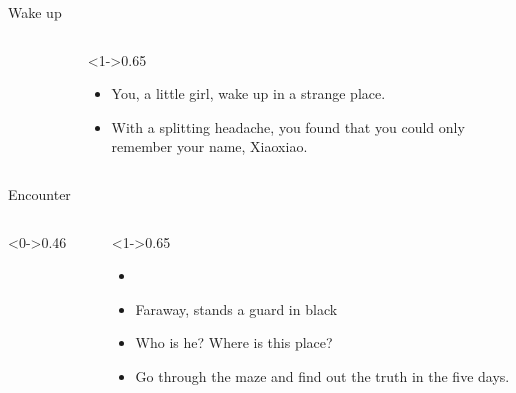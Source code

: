 \documentclass[notheorems]{beamer}
\begin{document}
\begin{framenl}{Wake up}
\begin{columns}[T]
\begin{column}
\begin{figure}[thpb]
{			}
		\end{figure}
	\end{column}
	\begin{column}<1->{0.65\textwidth}
		\begin{itemize}
			\item<1-> You, a little girl, wake up in a strange place.
			\item<2-> With a splitting headache, you found that you could only remember your name, Xiaoxiao.
		\end{itemize}
	\end{column}
	
\end{columns}	
\end{framenl}

\begin{framenl}{Encounter}
	\begin{columns}[T]
		\begin{column}<0->{0.46\textwidth}
			\begin{figure}[thpb]
				\centering
			\end{figure}
		\end{column}
		\begin{column}<1->{0.65\textwidth}
			\begin{itemize}
				\item []
				\item <1-> Faraway, stands a guard in black
				\item <2-> Who is he? Where is this place?
				\item <3-> Go through the maze and find out the truth in the five days. 
			\end{itemize}
		\end{column}
		
	\end{columns}	
	\end{framenl}
\end{document}
